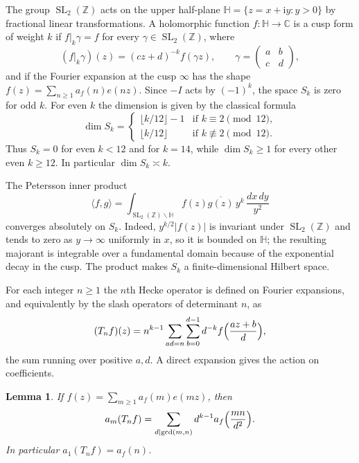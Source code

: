 \documentclass[11pt]{amsart}
\newtheorem{lemma}[theorem]{Lemma}
\theoremstyle{definition}
\theoremstyle{remark}
\numberwithin{equation}{section}
\DeclareMathOperator{\SL}{SL}
\newcommand{\HH}{\mathbb{H}}
\newcommand{\CC}{\mathbb{C}}
\newcommand{\ZZ}{\mathbb{Z}}
\newcommand{\ii}{\mathrm{i}}
\begin{document}
The group $\SL_2(\ZZ)$ acts on the upper half-plane $\HH=\{z=x+\ii y:y>0\}$ by fractional linear transformations. A holomorphic function $f:\HH\to\CC$ is a cusp form of weight $k$ if $f|_k\gamma=f$ for every $\gamma\in\SL_2(\ZZ)$, where
\[
(f|_k\gamma)(z)=(cz+d)^{-k}f(\gamma z),\qquad\gamma=\begin{pmatrix}a&b\\c&d\end{pmatrix},
\]
and if the Fourier expansion at the cusp $\infty$ has the shape $f(z)=\sum_{n\ge 1}a_f(n)e(nz)$. Since $-I$ acts by $(-1)^k$, the space $S_k$ is zero for odd $k$. For even $k$ the dimension is given by the classical formula \cite[Chapter~VII]{Serre1973}
\begin{equation}\label{eq:dimension}
\dim S_k=
\begin{cases}
\lfloor k/12\rfloor-1& \text{if }k\equiv 2\pmod{12},\\
\lfloor k/12\rfloor& \text{if }k\not\equiv 2\pmod{12}.
\end{cases}
\end{equation}
Thus $S_k=0$ for even $k<12$ and for $k=14$, while $\dim S_k\ge 1$ for every other even $k\ge 12$. In particular $\dim S_k\asymp k$.

The Petersson inner product
\begin{equation}\label{eq:petersson-product}
\langle f,g\rangle
=\int_{\SL_2(\ZZ)\backslash\HH}f(z)\overline{g(z)}\,y^k\,\frac{dx\,dy}{y^2}
\end{equation}
converges absolutely on $S_k$. Indeed, $y^{k/2}\lvert f(z)\rvert$ is invariant under $\SL_2(\ZZ)$ and tends to zero as $y\to\infty$ uniformly in $x$, so it is bounded on $\HH$; the resulting majorant is integrable over a fundamental domain because of the exponential decay in the cusp. The product makes $S_k$ a finite-dimensional Hilbert space.

For each integer $n\ge 1$ the $n$th Hecke operator is defined on Fourier expansions, and equivalently by the slash operators of determinant $n$, as
\begin{equation}\label{eq:hecke-def}
(T_nf)(z)
=n^{k-1}\sum_{ad=n}\sum_{b=0}^{d-1}d^{-k}
f\Bigl(\frac{az+b}{d}\Bigr),
\end{equation}
the sum running over positive $a,d$. A direct expansion gives the action on coefficients.

\begin{lemma}\label{lem:hecke-fourier}
If $f(z)=\sum_{m\ge 1}a_f(m)e(mz)$, then
\[
a_m(T_nf)=\sum_{d\mid\gcd(m,n)}d^{k-1}a_f\Bigl(\frac{mn}{d^2}\Bigr).
\]
In particular $a_1(T_nf)=a_f(n)$.
\end{lemma}
\end{document}

